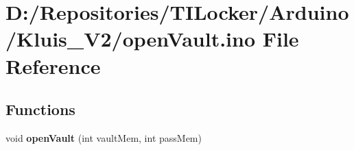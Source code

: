 \hypertarget{open_vault_8ino}{}\section{D\+:/\+Repositories/\+T\+I\+Locker/\+Arduino/\+Kluis\+\_\+\+V2/open\+Vault.ino File Reference}
\label{open_vault_8ino}
\subsection*{Functions}
\begin{DoxyCompactItemize}
\item 
\mbox{\label{open_vault_8ino_a36cb7bf4db504f4d4db64b475155bb41}} 
void {\bfseries open\+Vault} (int vault\+Mem, int pass\+Mem)
\end{DoxyCompactItemize}
